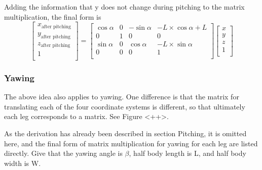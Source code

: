 Adding the information that y does not change during pitching to the matrix multiplication, the final form is
\begin{equation}
   \begin{bmatrix}
   x_\text{after pitching} \\
   y_\text{after pitching} \\
   z_\text{after pitching} \\
   1                       \\
   \end{bmatrix}
   =
   \begin{bmatrix}
   \cos\alpha & 0 & -\sin\alpha & -L \times \cos\alpha + L \\
   0 & 1 & 0 & 0 \\
   \sin\alpha & 0 & \cos\alpha & -L \times \sin\alpha \\
   0 & 0 & 0 & 1 \\
   \end{bmatrix}
   \begin{bmatrix}
   x \\
   y \\
   z \\
   1 \\
   \end{bmatrix}
\end{equation}

\subsubsection{Yawing}

The above idea also applies to yawing. One difference is that the matrix for translating each of the four coordinate systems is different, so that ultimately each leg corresponds to a matrix. See Figure <++>.


As the derivation has already been described in section Pitching, it is omitted here, and the final form of matrix multiplication for yawing for each leg are listed directly. Give that the yawing angle is $\beta$, half body length is L, and half body width is W.

